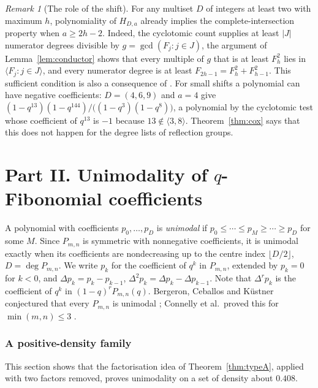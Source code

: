 \documentclass[11pt,a4paper]{article}
\theoremstyle{definition}\newtheorem{definition}[theorem]{Definition}
\theoremstyle{remark}\newtheorem{remark}[theorem]{Remark}\newtheorem{example}[theorem]{Example}
\numberwithin{equation}{section}
\begin{document}
\begin{remark}[The role of the shift]\label{rem:shift}
For any multiset $D$ of integers at least two with maximum $h$, polynomiality of $H_{D,a}$ already implies the complete-intersection property when $a\ge2h-2$. Indeed, the cyclotomic count supplies at least $|J|$ numerator degrees divisible by $g=\gcd(F_j:j\in J)$, the argument of Lemma~\ref{lem:conductor} shows that every multiple of $g$ that is at least $F_h^2$ lies in $\langle F_j:j\in J\rangle$, and every numerator degree is at least $F_{2h-1}=F_h^2+F_{h-1}^2$. This sufficient condition is also a consequence of \cite[Thm.~3.9]{gly}. For small shifts a polynomial can have negative coefficients: $D=(4,6,9)$ and $a=4$ give $(1-q^{13})(1-q^{144})/\big((1-q^3)(1-q^8)\big)$, a polynomial by the cyclotomic test whose coefficient of $q^{13}$ is $-1$ because $13\notin\langle3,8\rangle$. Theorem~\ref{thm:cox} says that this does not happen for the degree lists of reflection groups.
\end{remark}

\part*{Part II. Unimodality of $q$-Fibonomial coefficients}
\noindent A polynomial with coefficients $p_0,\ldots,p_D$ is \emph{unimodal} if $p_0\le\cdots\le p_M\ge\cdots\ge p_D$ for some $M$. Since $P_{m,n}$ is symmetric with nonnegative coefficients, it is unimodal exactly when its coefficients are nondecreasing up to the centre index $\lfloor D/2\rfloor$, $D=\deg P_{m,n}$. We write $p_k$ for the coefficient of $q^k$ in $P_{m,n}$, extended by $p_k=0$ for $k<0$, and $\Delta p_k=p_k-p_{k-1}$, $\Delta^2p_k=\Delta p_k-\Delta p_{k-1}$. Note that $\Delta^rp_k$ is the coefficient of $q^k$ in $(1-q)^rP_{m,n}(q)$. Bergeron, Ceballos and K\"ustner conjectured that every $P_{m,n}$ is unimodal \cite[Conj.~2.5]{bck}; Connelly et al.\ proved this for $\min(m,n)\le3$ \cite[Thm.~1.2]{connelly}.

\section{A positive-density family}\label{sec:density}
This section shows that the factorisation idea of Theorem~\ref{thm:typeA}, applied with two factors removed, proves unimodality on a set of density about $0.408$.
\end{document}
